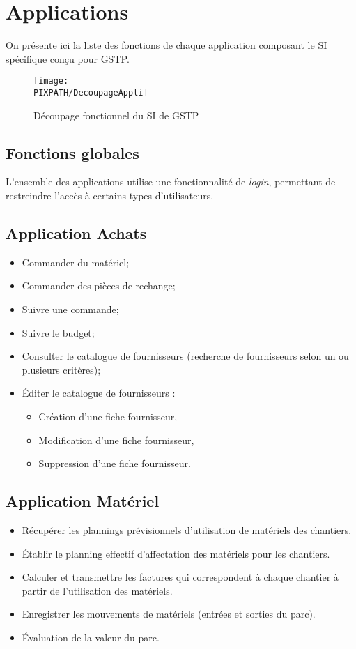 \section{Applications}

On présente ici la liste des fonctions de chaque application composant le
SI spécifique conçu pour GSTP.

\begin{figure}[h]
\centering
\caption{Découpage fonctionnel du SI de GSTP}
\texttt{[image: \\PIXPATH/DecoupageAppli]}
\end{figure}


\subsection{Fonctions globales}

L'ensemble des applications utilise une fonctionnalité de {\sl login}, permettant
de restreindre l'accès à certains types d'utilisateurs.


\subsection{Application Achats}

\begin{itemize}
\item Commander du matériel;
\item Commander des pièces de rechange;
\item Suivre une commande;
\item Suivre le budget;
\item Consulter le catalogue de fournisseurs (recherche de fournisseurs selon 
un ou plusieurs critères);
\item Éditer le catalogue de fournisseurs :
	\begin{itemize}
	\item Création d'une fiche fournisseur,
	\item Modification d'une fiche fournisseur,
	\item Suppression d'une fiche fournisseur.
	\end{itemize}
\end{itemize}

\subsection{Application Matériel}
\begin{itemize}
\item Récupérer les plannings prévisionnels d'utilisation de matériels
des chantiers.
\item Établir le planning effectif d'affectation des
matériels pour les chantiers.
\item Calculer et transmettre les factures qui correspondent à chaque chantier
à partir de l'utilisation des matériels.
\item Enregistrer les mouvements de matériels (entrées et sorties du parc).
\item Évaluation de la valeur du parc.
\end{itemize}


